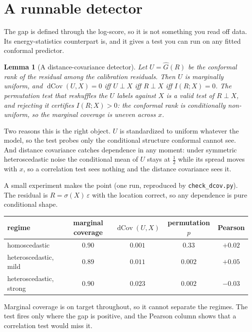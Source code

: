 \documentclass[11pt]{article}
\newtheorem{lemma}{Lemma}
\begin{document}
\section{A runnable detector}

The gap is defined through the log-score, so it is not something you read off data. Its
energy-statistics counterpart is, and it gives a test you can run on any fitted conformal
predictor.

\begin{lemma}[A distance-covariance detector]\label{lem:dcov}
Let $U=\widehat G(R)$ be the conformal rank of the residual among the calibration residuals.
Then $U$ is marginally uniform, and $\operatorname{dCov}(U,X)=0$ iff $U\perp X$ iff $R\perp X$ iff
$I(R;X)=0$. The permutation test that reshuffles the $U$ labels against $X$ is a valid test of
$R\perp X$, and rejecting it certifies $I(R;X)>0$: the conformal rank is conditionally
non-uniform, so the marginal coverage is uneven across $x$.
\end{lemma}

Two reasons this is the right object. $U$ is standardized to uniform whatever the model, so the
test probes only the conditional structure conformal cannot see. And distance covariance
\citep{szekely2007} catches dependence in any moment: under symmetric heteroscedastic noise the
conditional mean of $U$ stays at $\tfrac12$ while its spread moves with $x$, so a correlation
test sees nothing and the distance covariance sees it.

A small experiment makes the point (one run, reproduced by \texttt{check\_dcov.py}). The
residual is $R=\sigma(X)\,\varepsilon$ with the location correct, so any dependence is pure
conditional shape.

\begin{center}
\begin{tabular}{lcccc}
\hline
regime & marginal coverage & $\operatorname{dCov}(U,X)$ & permutation $p$ & Pearson \\
\hline
homoscedastic & $0.90$ & $0.001$ & $0.33$ & $+0.02$ \\
heteroscedastic, mild & $0.89$ & $0.011$ & $0.002$ & $+0.05$ \\
heteroscedastic, strong & $0.90$ & $0.023$ & $0.002$ & $-0.03$ \\
\hline
\end{tabular}
\end{center}

Marginal coverage is on target throughout, so it cannot separate the regimes. The test fires
only where the gap is positive, and the Pearson column shows that a correlation test would miss
it.
\end{document}
